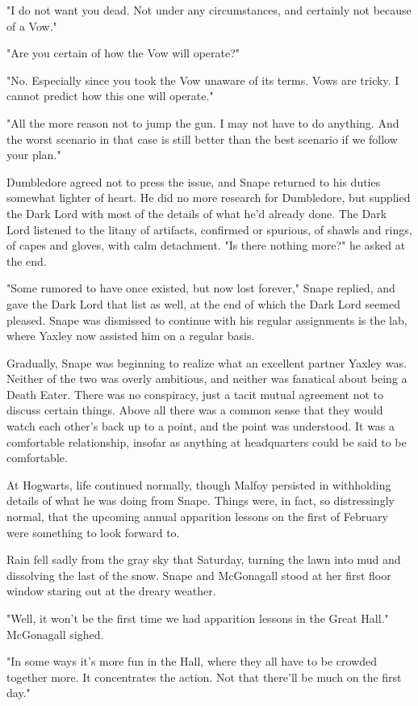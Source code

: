 "I do not want you dead. Not under any circumstances, and certainly not because of a Vow."

"Are you certain of how the Vow will operate?"

"No. Especially since you took the Vow unaware of its terms. Vows are tricky. I cannot predict how this one will operate."

"All the more reason not to jump the gun. I may not have to do anything. And the worst scenario in that case is still better than the best scenario if we follow your plan."

Dumbledore agreed not to press the issue, and Snape returned to his duties somewhat lighter of heart. He did no more research for Dumbledore, but supplied the Dark Lord with most of the details of what he'd already done. The Dark Lord listened to the litany of artifacts, confirmed or spurious, of shawls and rings, of capes and gloves, with calm detachment. "Is there nothing more?" he asked at the end.

"Some rumored to have once existed, but now lost forever," Snape replied, and gave the Dark Lord that list as well, at the end of which the Dark Lord seemed pleased. Snape was dismissed to continue with his regular assignments is the lab, where Yaxley now assisted him on a regular basis.

Gradually, Snape was beginning to realize what an excellent partner Yaxley was. Neither of the two was overly ambitious, and neither was fanatical about being a Death Eater. There was no conspiracy, just a tacit mutual agreement not to discuss certain things. Above all there was a common sense that they would watch each other's back up to a point, and the point was understood. It was a comfortable relationship, insofar as anything at headquarters could be said to be comfortable.

At Hogwarts, life continued normally, though Malfoy persisted in withholding details of what he was doing from Snape. Things were, in fact, so distressingly normal, that the upcoming annual apparition lessons on the first of February were something to look forward to.

Rain fell sadly from the gray sky that Saturday, turning the lawn into mud and dissolving the last of the snow. Snape and McGonagall stood at her first floor window staring out at the dreary weather.

"Well, it won't be the first time we had apparition lessons in the Great Hall." McGonagall sighed.

"In some ways it's more fun in the Hall, where they all have to be crowded together more. It concentrates the action. Not that there'll be much on the first day."

